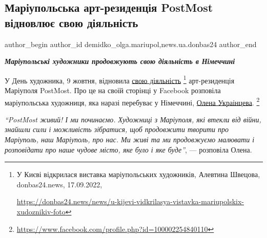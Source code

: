  
 
 
 
 
 
\subsection{Маріупольська арт-резиденція PostMost відновлює свою діяльність}
\label{sec:11_10_2022.stz.news.ua.donbas24.1.mrpl_art_rezidencia_postmost_vidnov_dijalnist}
 
\ifcmt
 author_begin
   author_id demidko_olga.mariupol,news.ua.donbas24
 author_end
\fi

\begin{center}
  \em\color{blue}\bfseries\Large
Маріупольські художники продовжують свою діяльність в Німеччині
\end{center}

У День художника, 9 жовтня, відновила \href{https://donbas24.news/news/u-kijevi-vidkrilasya-vistavka-mariupolskix-xudoznikiv-foto}{свою діяльність}%
\footnote{У Києві відкрилася виставка маріупольських художників, Алевтина Швецова, donbas24.news, 17.09.2022, \par\url{https://donbas24.news/news/u-kijevi-vidkrilasya-vistavka-mariupolskix-xudoznikiv-foto}}
арт-резиденція Маріуполя PostMost. Про це на своїй сторінці у Facebook
розповіла маріупольська художниця, яка наразі перебуває у Німеччині, \href{https://www.facebook.com/profile.php?id=100002254840110}{Олена Украінцева}.%
\footnote{\url{https://www.facebook.com/profile.php?id=100002254840110}}

\begin{leftbar}
\emph{\enquote{PostMost живий! І ми починаємо. Художниці з Маріуполя, які втекли від
війни, знайшли сили і можливість зібратися, щоб продовжити творити про
Маріуполь, наш Маріуполь, про нас. Ми живі та ми продовжуємо малювати і
розповідати про наше чудове місто, яке було і яке буде}}, — розповіла Олена. 
\end{leftbar}

